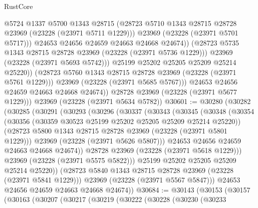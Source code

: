 \begin{lexlean}{RustCore}
\begin{coremodule}
                        @5724
                        @1337
                        @5700
                        @1343
                        @28715
                        (@28723 @5710 @1343 @28715 @28728 @23969 (@23228 (@23971 @5711 @1229)))
                        @23969
                        (@23228 (@23971 @5701 @5717)))
                      @24653
                      @24656
                      @24659
                      @24663
                      @24668
                      @24674))
                  (@28723 @5735 @1343 @28715 @28728 @23969 (@23228 (@23971 @5736 @1229)))
                  @23969
                  (@23228 (@23971 @5693 @5742)))
                @25199
                @25202
                @25205
                @25209
                @25214
                @25220))
            (@28723 @5760 @1343 @28715 @28728 @23969 (@23228 (@23971 @5761 @1229)))
            @23969
            (@23228 (@23971 @5685 @5767)))
          @24653
          @24656
          @24659
          @24663
          @24668
          @24674))
      @28728
      @23969
      (@23228 (@23971 @5677 @1229)))
    @23969
    (@23228 (@23971 @5634 @5782))
@30601 := @30280
    (@30282
      (@30285
        (@30291
          (@30293
            (@30296
              (@30337
                (@30343
                  (@30345
                    (@30348
                      (@30354
                        (@30356 (@30359 @30523 @25199 @25202 @25205 @25209 @25214 @25220))
                        (@28723 @5800 @1343 @28715 @28728 @23969 (@23228 (@23971 @5801 @1229)))
                        @23969
                        (@23228 (@23971 @5626 @5807)))
                      @24653
                      @24656
                      @24659
                      @24663
                      @24668
                      @24674))
                  @28728
                  @23969
                  (@23228 (@23971 @5618 @1229)))
                @23969
                (@23228 (@23971 @5575 @5822)))
              @25199
              @25202
              @25205
              @25209
              @25214
              @25220))
          (@28723 @5840 @1343 @28715 @28728 @23969 (@23228 (@23971 @5841 @1229)))
          @23969
          (@23228 (@23971 @5567 @5847)))
        @24653
        @24656
        @24659
        @24663
        @24668
        @24674))
@30684 := @30143
    (@30153
      (@30157
        (@30163
          (@30207
            (@30217
              (@30219
                (@30222
                  (@30228
                    (@30230
                      (@30233

\end{coremodule}
\end{lexlean}
